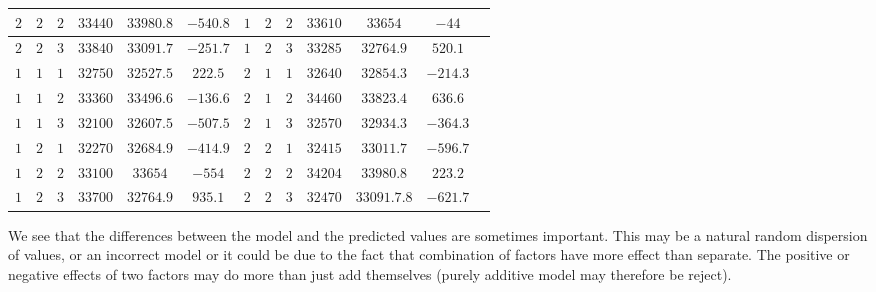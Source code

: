 \begin{table}[H]
\begin{center}
\begin{tabular}{|c|c|c|c|c|c|c|c|c|c|c|c|c|}
				$2$ & $2$ & $2$ & $33440$ & $33980.8$ & $-540.8$ & $1$ & $2$ & $2$ & $33610$ & $33654$ & $-44$\\ \hline
				$2$ & $2$ & $3$ & $33840$ & $33091.7$ & $-251.7$ & $1$ & $2$ & $3$ & $33285$ & $32764.9$ & $520.1$\\ \hline
				$1$ & $1$ & $1$ & $32750$ & $32527.5$ & $222.5$ & $2$ & $1$ & $1$ & $32640$ & $32854.3$ & $-214.3$\\ \hline
				$1$ & $1$ & $2$ & $33360$ & $33496.6$ & $-136.6$ & $2$ & $1$ & $2$ & $34460$ & $33823.4$ & $636.6$\\ \hline
				$1$ & $1$ & $3$ & $32100$ & $32607.5$ & $-507.5$ & $2$ & $1$ & $3$ & $32570$ & $32934.3$ & $-364.3$\\ \hline
				$1$ & $2$ & $1$ & $32270$ & $32684.9$ & $-414.9$ & $2$ & $2$ & $1$ & $32415$ & $33011.7$ & $-596.7$\\ \hline
				$1$ & $2$ & $2$ & $33100$ & $33654$ & $-554$ & $2$ & $2$ & $2$ & $34204$ & $33980.8$ & $223.2$\\ \hline
				$1$ & $2$ & $3$ & $33700$ & $32764.9$ & $935.1$ & $2$ & $2$ & $3$ & $32470$ & $33091.7.8$ & $-621.7$\\ \hline
	 		\end{tabular}
		\end{center}
	\end{table}
	We see that the differences between the model and the predicted values are sometimes important. This may be a natural random dispersion of values, or an incorrect model or it could be due to the fact that combination of factors have more effect than separate. The positive or negative effects of two factors may do more than just add themselves (purely additive model may therefore be reject).\\
		
